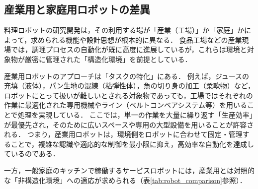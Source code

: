 \subsection{産業用と家庭用ロボットの差異}

料理ロボットの研究開発は，その利用する場が「産業（工場）」か「家庭」かによって，求められる機能や設計思想が根本的に異なる．
食品工場などの産業現場では，調理プロセスの自動化が既に高度に進展しているが，これらは環境と対象物が厳密に管理された「構造化環境」を前提としている．

産業用ロボットのアプローチは「タスクの特化」にある．
例えば，ジュースの充填（液体），パン生地の混練（粘弾性体），魚の切り身の加工（柔軟物）など，ロボットにとって扱いが難しいとされる対象物であっても，工場ではそれぞれの作業に最適化された専用機械やライン（ベルトコンベアシステム等）を用いることで処理を実現している．
ここでは，単一の作業を大量に繰り返す「生産効率」が最優先され，そのために広いスペースや専用の大型設備を用いることが許容される．
つまり，産業用ロボットは，環境側をロボットに合わせて固定・管理することで，複雑な認識や適応的な制御を最小限に抑え，高効率な自動化を達成しているのである．

一方，一般家庭のキッチンで稼働するサービスロボットには，産業用とは対照的な「非構造化環境」への適応が求められる（表\ref{tab:robot_comparison}参照）．

